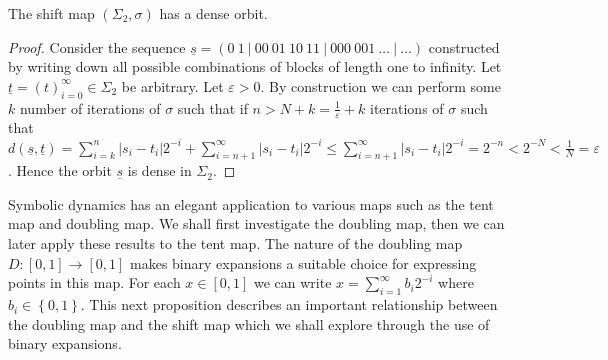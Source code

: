 \begin{prop} \label{prop:shift-map-dense-orbit}
    The shift map $(\Sigma_2, \sigma)$ has a dense orbit.
    \begin{proof}
        Consider the sequence $\underline{s} = (0\ 1\ |\ 00\ 01\ 10\ 11\ |\ 000\ 001\ \dots\ |\ \dots)$ constructed by writing down all possible combinations of blocks of length one to infinity. Let $\underline{t} = (t)_{i=0}^{\infty} \in \Sigma_2$ be arbitrary. Let $\varepsilon > 0$. By construction we can perform some $k$ number of iterations of $\sigma$ such that if $n > N + k = \frac{1}{\varepsilon} + k$ iterations of $\sigma$ such that $d(\underline{s}, \underline{t}) = \sum_{i = k}^{n}|s_i - t_i|2^{-i} + \sum_{i = n+1}^{\infty}|s_i - t_i|2^{-i} \leq \sum_{i = n+1}^{\infty}|s_i - t_i|2^{-i} = 2^{-n} < 2^{-N} < \frac{1}{N} = \varepsilon$. Hence the orbit $\underline{s}$ is dense in $\Sigma_2$.
    \end{proof}
\end{prop}

Symbolic dynamics has an elegant application to various maps such as the tent map and doubling map. We shall first investigate the doubling map, then we can later apply these results to the tent map. The nature of the doubling map $D: [0, 1] \to [0, 1]$ makes binary expansions a suitable choice for expressing points in this map. For each $x \in [0, 1]$ we can write $x=\sum_{i=1}^{\infty}b_i2^{-i}$ where $b_i \in \left\lbrace 0, 1 \right\rbrace$. This next proposition describes an important relationship between the doubling map and the shift map which we shall explore through the use of binary expansions.

